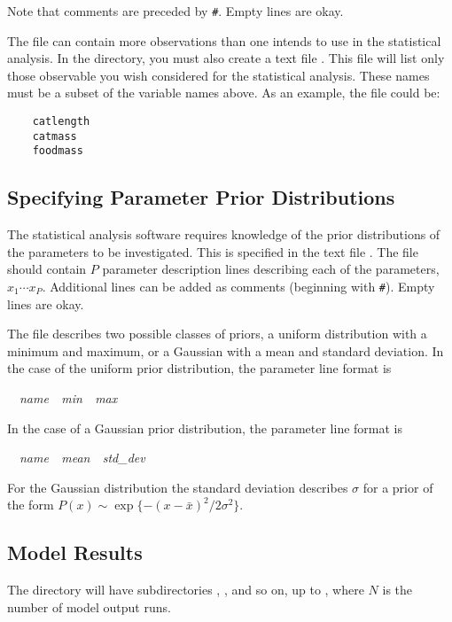 Note that comments are preceded by \verb+#+. Empty lines are okay.

The  file can contain more observations than one intends to use in the statistical analysis. In the  directory, you must also create a text file . This file will list only those observable you wish considered for the statistical analysis. These names must be a subset of the variable names above. As an example, the file could be:

\begin{verbatim}
    catlength
    catmass
    foodmass
\end{verbatim}

\subsection{Specifying Parameter Prior Distributions}

The statistical analysis software requires knowledge of the prior distributions of the parameters to be investigated. This is specified in the text file . The file should contain $P$ parameter description lines describing each of the parameters, $x_1\cdots x_P$. Additional lines can be added as comments (beginning with \verb+#+). Empty lines are okay.

The  file describes two possible classes of priors, a uniform distribution with a minimum and maximum, or a Gaussian with a mean and standard deviation. In the case of the uniform prior distribution, the parameter line format is

\hspace*{20pt}{\tt uniform}~~{\it name~~min~~max}

In the case of a Gaussian prior distribution, the parameter line format is

\hspace*{20pt}{\tt gaussian}~~{\it name~~mean~~std\_dev}

For the Gaussian distribution the standard deviation describes $\sigma$ for a prior of the form $P(x)\sim \exp\{-(x-\bar{x})^2/2\sigma^2\}$. 

\subsection{Model Results}
The  directory will have subdirectories , , and so on, up to , where $N$ is the number of model output runs.

